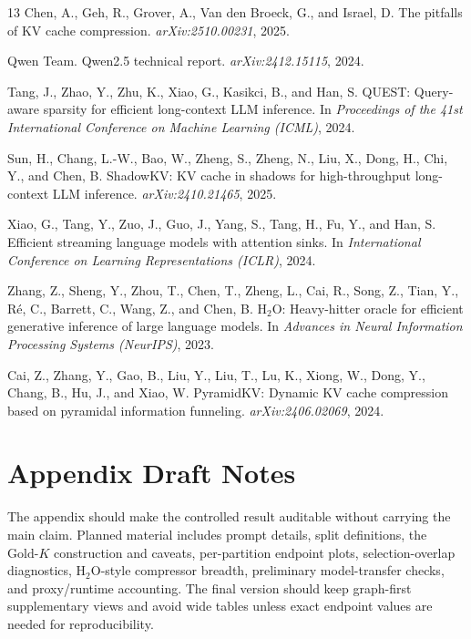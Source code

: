 \documentclass{article}
\newcommand{\goldk}{\ensuremath{\mathrm{Gold}\mbox{-}K}}
\begin{document}
\begin{thebibliography}{13}
Chen, A., Geh, R., Grover, A., Van den Broeck, G., and Israel, D.
\newblock The pitfalls of KV cache compression.
\newblock \emph{arXiv:2510.00231}, 2025.

Qwen Team.
\newblock Qwen2.5 technical report.
\newblock \emph{arXiv:2412.15115}, 2024.

Tang, J., Zhao, Y., Zhu, K., Xiao, G., Kasikci, B., and Han, S.
\newblock QUEST: Query-aware sparsity for efficient long-context LLM
  inference.
\newblock In \emph{Proceedings of the 41st International Conference on
  Machine Learning (ICML)}, 2024.

Sun, H., Chang, L.-W., Bao, W., Zheng, S., Zheng, N., Liu, X., Dong,
  H., Chi, Y., and Chen, B.
\newblock ShadowKV: KV cache in shadows for high-throughput long-context
  LLM inference.
\newblock \emph{arXiv:2410.21465}, 2025.

Xiao, G., Tang, Y., Zuo, J., Guo, J., Yang, S., Tang, H., Fu, Y.,
  and Han, S.
\newblock Efficient streaming language models with attention sinks.
\newblock In \emph{International Conference on Learning Representations
  (ICLR)}, 2024.

Zhang, Z., Sheng, Y., Zhou, T., Chen, T., Zheng, L., Cai, R., Song, Z.,
  Tian, Y., R{\'e}, C., Barrett, C., Wang, Z., and Chen, B.
\newblock H$_2$O: Heavy-hitter oracle for efficient generative inference
  of large language models.
\newblock In \emph{Advances in Neural Information Processing Systems
  (NeurIPS)}, 2023.

Cai, Z., Zhang, Y., Gao, B., Liu, Y., Liu, T., Lu, K., Xiong, W.,
  Dong, Y., Chang, B., Hu, J., and Xiao, W.
\newblock PyramidKV: Dynamic KV cache compression based on pyramidal
  information funneling.
\newblock \emph{arXiv:2406.02069}, 2024.

\end{thebibliography}

\appendix

\section{Appendix Draft Notes}
\label{app:draft-notes}

The appendix should make the controlled result auditable without
carrying the main claim.
Planned material includes prompt details, split definitions, the
$\goldk{}$ construction and caveats, per-partition endpoint plots,
selection-overlap diagnostics, H$_2$O-style compressor breadth,
preliminary model-transfer checks, and proxy/runtime accounting.
The final version should keep graph-first supplementary views and avoid
wide tables unless exact endpoint values are needed for reproducibility.
\end{document}
